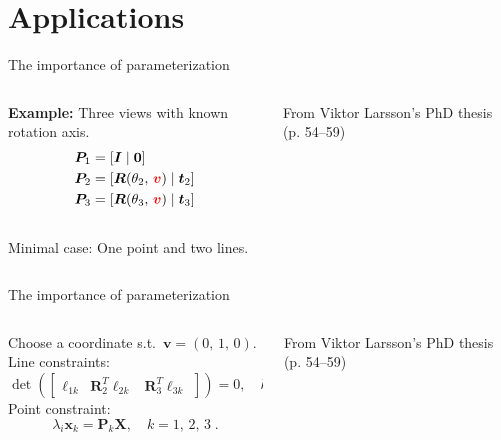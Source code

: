 \documentclass[aspectratio=169]{beamer}
\newcommand{\mat}[1]{\bm{#1}}
\newcommand{\T}{T}
\begin{document}
\section{Applications}
\begin{frame}[t]{The importance of parameterization}
\begin{columns}
    \begin{column}{0.5\textwidth}
        \begin{minipage}[t][\textheight][t]{\textwidth}
        \theimportanceOneHeight
        \textbf{Example:} Three views with known rotation axis.\\[8mm]
        \begin{equation*}
            \begin{aligned}
                \mat{P}_1 &= [\mat{I}\;|\;\mat{0}] \\
                \mat{P}_2 &= [\mat{R}(\theta_2,\,{\color{red}\mat{v}})\;|\;\mat{t}_2] \\
                \mat{P}_3 &= [\mat{R}(\theta_3,\,{\color{red}\mat{v}})\;|\;\mat{t}_3]
            \end{aligned}
        \end{equation*}\\[8mm]
        Minimal case: One point and two lines.
        \end{minipage}
    \end{column}%
    \begin{column}{0.5\textwidth}
        \centering
        
        {\footnotesize From Viktor Larsson's PhD thesis (p. 54--59)}
    \end{column}
\end{columns}
\end{frame}

\begin{frame}[t]{The importance of parameterization}
\begin{columns}
    \begin{column}{0.5\textwidth}
        \begin{minipage}[t][\textheight][t]{\textwidth}
        \theimportanceOneHeight
        Choose a coordinate s.t.\@~$\mat{v}=(0,\,1,\,0)$.\\[5mm]
        Line constraints:
        \[
            \det\!\left(\begin{bmatrix}
                    \mat{\ell}_{1k} &
                    \mat{R}_2^\T\mat{\ell}_{2k} &
                    \mat{R}_3^\T\mat{\ell}_{3k}
                \end{bmatrix}\right) = 0,
        \quad k = 1,\,2\;.
        \]
        Point constraint:
        \[
            \lambda_i\mat{x}_k = \mat{P}_k\mat{X},  \quad k=1,\,2,\, 3\;.
        \]
        \end{minipage}
    \end{column}%
    \begin{column}{0.5\textwidth}
        \centering
        
        {\footnotesize From Viktor Larsson's PhD thesis (p. 54--59)}
    \end{column}
\end{columns}
\end{frame}
\end{document}
